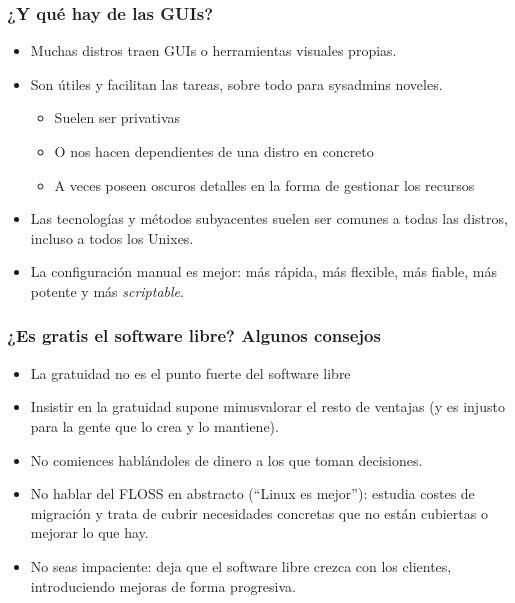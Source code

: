 \documentclass{beamer}
\begin{document}

\begin{frame}
\frametitle{¿Y qué hay de las GUIs?}



\pause

\begin{itemize}
\item Muchas distros traen GUIs o herramientas visuales propias. 
\item Son útiles y facilitan las tareas, sobre todo para sysadmins noveles.

\pause

	\begin{itemize}
	\item Suelen ser privativas
	\item O nos hacen dependientes de una distro en concreto
	\item A veces poseen oscuros detalles en la forma de gestionar los recursos
	\end{itemize}

\pause

\item Las tecnologías y métodos subyacentes suelen ser comunes a todas las distros, incluso a todos los Unixes.

\pause

\item La configuración manual es mejor: más rápida, más flexible, más fiable, más potente y más \textit{scriptable}.
\end{itemize}
\end{frame}




\begin{frame}
\frametitle{¿Es gratis el software libre? Algunos consejos}

\pause

\begin{itemize}
\item La gratuidad no es el punto fuerte del software libre
\item Insistir en la gratuidad supone minusvalorar el resto de ventajas (y es injusto para la gente que lo crea y lo mantiene).
\item No comiences hablándoles de dinero a los que toman decisiones. 
\item No hablar del FLOSS en abstracto (``Linux es mejor''): estudia costes de migración y trata de cubrir necesidades concretas que no están cubiertas o mejorar lo que hay.
\item No seas impaciente: deja que el software libre crezca con los clientes, introduciendo mejoras de forma progresiva.
\end{itemize}
\end{frame}
\end{document}
